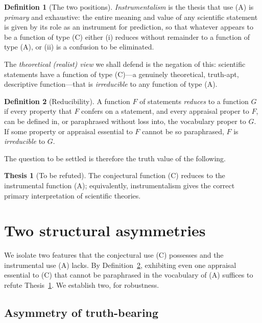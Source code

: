\documentclass{amsart}
\theoremstyle{definition}
\newtheorem{definition}{Definition}
\newtheorem{thesis}{Thesis}
\theoremstyle{plain}
\begin{document}
\begin{definition}[The two positions]\label{def:positions}
\emph{Instrumentalism} is the thesis that use (A) is \emph{primary} and
exhaustive: the entire meaning and value of any scientific statement is given
by its role as an instrument for prediction, so that whatever appears to be a
function of type (C) either (i) reduces without remainder to a function of type
(A), or (ii) is a confusion to be eliminated.

The \emph{theoretical (realist) view} we shall defend is the negation of this:
scientific statements have a function of type (C)---a genuinely theoretical,
truth-apt, descriptive function---that is \emph{irreducible} to any function of
type (A).
\end{definition}

\begin{definition}[Reducibility]\label{def:reduce}
A function $F$ of statements \emph{reduces} to a function $G$ if every property
that $F$ confers on a statement, and every appraisal proper to $F$, can be
defined in, or paraphrased without loss into, the vocabulary proper to $G$. If
some property or appraisal essential to $F$ cannot be so paraphrased, $F$ is
\emph{irreducible} to $G$.
\end{definition}

The question to be settled is therefore the truth value of the following.

\begin{thesis}[To be refuted]\label{th:inst}
The conjectural function \textup{(C)} reduces to the instrumental function
\textup{(A)}; equivalently, instrumentalism gives the correct primary
interpretation of scientific theories.
\end{thesis}

\section{Two structural asymmetries}

We isolate two features that the conjectural use (C) possesses and the
instrumental use (A) lacks. By Definition~\ref{def:reduce}, exhibiting even one
appraisal essential to (C) that cannot be paraphrased in the vocabulary of (A)
suffices to refute Thesis~\ref{th:inst}. We establish two, for robustness.

\subsection{Asymmetry of truth-bearing}
\end{document}
